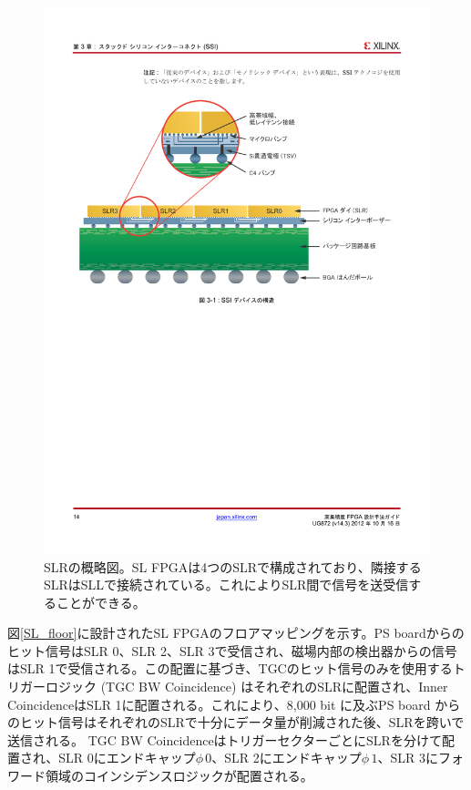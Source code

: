 \begin{figure} 
\centering
\includegraphics[width=16cm]{fig/Intro/ISEE_abstract.pdf}
\caption[SLRの概略図]{SLRの概略図。SL FPGAは4つのSLRで構成されており、隣接するSLRはSLLで接続されている。これによりSLR間で信号を送受信することができる。}
\label{ISEE_abstract}
\end{figure}

図\ref{SL_floor}に設計されたSL FPGAのフロアマッピングを示す。PS boardからのヒット信号はSLR 0、SLR 2、SLR 3で受信され、磁場内部の検出器からの信号はSLR 1で受信される。この配置に基づき、TGCのヒット信号のみを使用するトリガーロジック (TGC BW Coincidence) はそれぞれのSLRに配置され、Inner CoincidenceはSLR 1に配置される。これにより、8,000 bit に及ぶPS board からのヒット信号はそれぞれのSLRで十分にデータ量が削減された後、SLRを跨いで送信される。
TGC BW CoincidenceはトリガーセクターごとにSLRを分けて配置され、SLR 0にエンドキャップ$\phi\,0$、SLR 2にエンドキャップ$\phi\,1$、SLR 3にフォワード領域のコインシデンスロジックが配置される。

